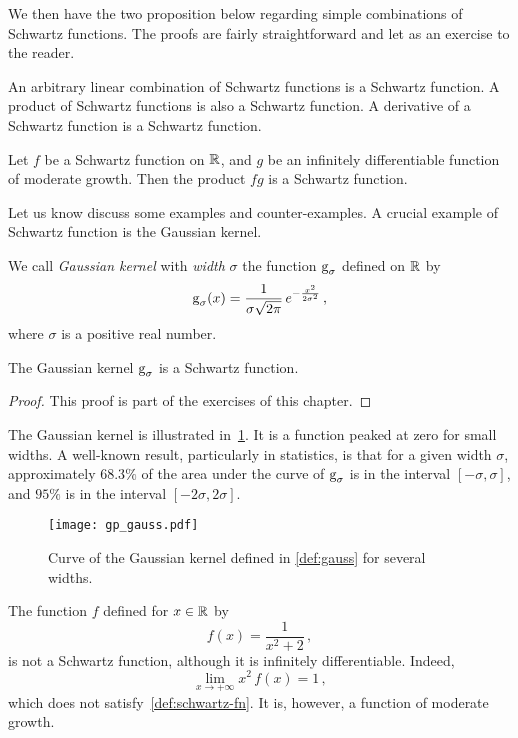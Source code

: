 We then have the two proposition below regarding simple combinations of Schwartz
functions. The proofs are fairly straightforward and let as an exercise to the reader.
\begin{proposition}
  \label{prop:schwartz-comb}
  An arbitrary linear combination of Schwartz functions is a Schwartz function. A product
  of Schwartz functions is also a Schwartz function. A derivative of a Schwartz function
  is a Schwartz function.
\end{proposition}
\begin{proposition}
  Let $f$ be a Schwartz function on $\mathbb{R}$, and $g$ be an infinitely differentiable function
  of moderate growth. Then the product $fg$ is a Schwartz function.
\end{proposition}
Let us know discuss some examples and counter-examples. A crucial example of Schwartz
function is the Gaussian kernel.
\begin{definition}
  \label{def:gauss}
  We call \emph{Gaussian kernel} with \emph{width} $\sigma$ the function $\operatorname{g}_{\sigma}$
  defined on $\mathbb{R}$ by
  \begin{equation}
    \operatorname{g}_{\sigma}(x)=\frac{1}{\sigma\sqrt{2\pi}}\,e^{-\frac{x^2}{2\sigma^2}}\,,
  \end{equation}
  where $\sigma$ is a positive real number.
\end{definition}
\begin{proposition}
  The Gaussian kernel $\operatorname{g}_{\sigma}$ is a Schwartz function.
\end{proposition}
\begin{proof}
  This proof is part of the exercises of this chapter.
\end{proof}
The Gaussian kernel is illustrated in~\cref{fig:gauss}. It is a function peaked at zero
for small widths. A well-known result, particularly in statistics, is that for a given
width $\sigma$, approximately $68.3\%$ of the area under the curve of $\operatorname{g}_{\sigma}$ is
in the interval $[-\sigma,\sigma]$, and $95\%$ is in the interval $[-2\sigma,2\sigma]$.
\begin{figure}[t]
  \centering
  \texttt{[image: gp\_gauss.pdf]}
  \caption{Curve of the Gaussian kernel defined in \cref{def:gauss} for several widths.}
  \label{fig:gauss}
\end{figure}
\begin{example}
  The function $f$ defined for $x\in\mathbb{R}$ by
  \begin{equation}
    f(x)=\frac{1}{x^2+2}\,,
  \end{equation}
  is not a Schwartz function, although it is infinitely differentiable. Indeed,
  \begin{equation}
    \lim_{x\to+\infty} x^2\,f(x)=1\,,
  \end{equation}
  which does not satisfy~\cref{def:schwartz-fn}. It is, however, a function of moderate
  growth.
\end{example}
